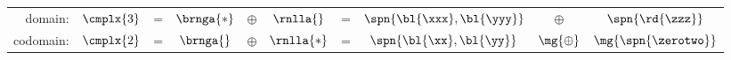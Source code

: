 \begin{table}[h!]
	\begin{center}
		\begin{tabular}{rccccccccc}
		  domain: & $\cmplx{3}$ & = & $\brnga{*}$ & $\oplus$ & $\rnlla{}$ & = & $\spn{\bl{\xxx},\bl{\yyy}}$ & $\oplus$ & $\spn{\rd{\zzz}}$ \\[17pt]
		  codomain: & $\cmplx{2}$ & = & $\brnga{}$ & $\oplus$ & $\rnlla{*}$ & = & $\spn{\bl{\xx},\bl{\yy}}$ & $\mg{\oplus}$ & $\mg{\spn{\zerotwo}}$
		\end{tabular}
	\end{center}
\end{table}%

\endinput  %